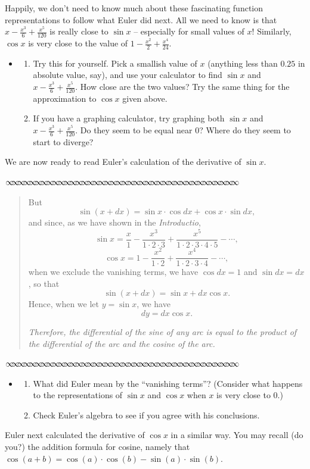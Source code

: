 \documentclass[11pt]{article}
\newcommand{\sep}{\vspace{-3pt}
\begin{center}
{\mathversion{normal}
$\infty \mspace{-5.5mu}\infty \mspace{-5.5mu}\infty \mspace{-5.5mu}\infty \mspace{-5.5mu}
\infty \mspace{-5.5mu}\infty \mspace{-5.5mu}\infty \mspace{-5.5mu}\infty \mspace{-5.5mu}
\infty \mspace{-5.5mu}\infty \mspace{-5.5mu}\infty \mspace{-5.5mu}\infty \mspace{-5.5mu}
\infty \mspace{-5.5mu}\infty \mspace{-5.5mu}\infty \mspace{-5.5mu}\infty \mspace{-5.5mu}
\infty \mspace{-5.5mu}\infty \mspace{-5.5mu}\infty \mspace{-5.5mu}\infty \mspace{-5.5mu}
\infty \mspace{-5.5mu}\infty \mspace{-5.5mu}\infty \mspace{-5.5mu}\infty \mspace{-5.5mu}
\infty \mspace{-5.5mu}\infty \mspace{-5.5mu}\infty \mspace{-5.5mu}\infty \mspace{-5.5mu}
\infty \mspace{-5.5mu}\infty \mspace{-5.5mu}\infty \mspace{-5.5mu}\infty \mspace{-5.5mu}
\infty \mspace{-5.5mu}\infty \mspace{-5.5mu}\infty \mspace{-5.5mu}\infty \mspace{-5.5mu}
\infty \mspace{-5.5mu}\infty \mspace{-5.5mu}\infty \mspace{-5.5mu}\infty \mspace{-5.5mu}$}
\end{center} \vspace*{-5pt}}
\newenvironment{source}%
 {\bigskip \sep \vspace*{-6pt} \begin{quote}
          \begin{sf}   }
   {   \end{sf}     \end{quote} \vspace*{-6pt} \sep \bigskip}%
\newcounter{tasknumb}
\newcommand{\tasknumb}{\stepcounter{tasknumb}\textmd{\textbf{$\fbox{$\fbox{Task \thetasknumb}$}$}}}
\newenvironment{task}%
 {\begin{itemize}
 \item[\tasknumb]  }
{
    \end{itemize}    }%
\begin{document}
Happily, we don't need to know much about these fascinating function representations to follow what Euler did next.  All we need to know is that $x -\frac{x^3}{6} + \frac{x^5}{120}$ is really close to $\sin x$ -- especially for small values of $x$!    Similarly, $\cos x$ is very close to the value of $1 - \frac{x^2}{2} + \frac{x^4}{24}$.
\begin{task}\begin{enumerate}
\item[(a)] Try this for yourself.  Pick a smallish value of $x$ (anything less than $0.25$ in absolute value, say), and use your calculator to find $\sin x$ and $x -\frac{x^3}{6} + \frac{x^5}{120}$.  How close are the two values?  Try the same thing for the approximation to $\cos x$ given above.
\item[(b)] If you have a graphing calculator, try graphing both $\sin x$ and $x -\frac{x^3}{6} + \frac{x^5}{120}$.  Do they seem to be equal near $0$?  Where do they seem to start to diverge?
    \end{enumerate}
\end{task}

\bigskip
We are now ready to read Euler's calculation of the derivative of $\sin x$.

\begin{source}
\vspace*{-6pt}
But
$$
\sin(x + dx) = \sin x \cdot \cos dx + \cos x \cdot \sin dx,
$$
and since, as we have shown in the \emph{Introductio},
$$
\sin x = \frac{x}{1} - \frac{x^3}{1 \cdot 2 \cdot 3} + \frac{x^5}{1 \cdot 2 \cdot 3 \cdot 4 \cdot 5} - \cdots ,
$$
$$
\cos x = 1 -  \frac{x^2}{1 \cdot 2} + \frac{x^4}{1 \cdot 2 \cdot 3 \cdot 4} - \cdots ,
$$
when we exclude the vanishing terms, we have $\cos dx = 1$ and $\sin dx = dx$, so that
$$
\sin(x + dx) = \sin x + dx \cos x.
$$
Hence, when we let $y = \sin x$, we have
$$
dy = dx \cos x.
$$

\textit{Therefore, the differential of the sine of any arc is equal to the product of the differential of the arc and the cosine of the arc.}
\vspace*{-8pt}
\end{source}


\begin{task}
\begin{enumerate}
\item[(a)] What did Euler mean by the ``vanishing terms''?  (Consider what happens to the representations of $\sin x$ and $\cos x$ when $x$ is very close to $0$.)
\item[(b)] Check Euler's algebra to see if you agree with his conclusions.
\end{enumerate}
\end{task}
Euler next calculated the derivative of $\cos x$ in a similar way. You may recall (do you?) the addition formula for cosine, namely that $\cos(a+b) = \cos(a) \cdot \cos(b) - \sin(a) \cdot \sin(b)$.
\end{document}
